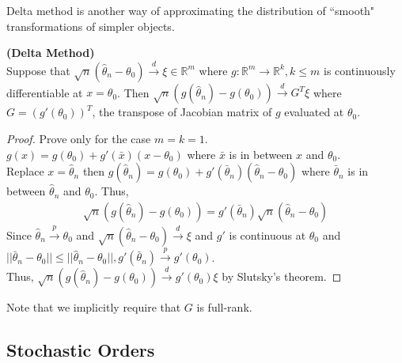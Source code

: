 \documentclass[11pt]{article} %
\theoremstyle{definition}
\numberwithin{defn}{subsection}
\numberwithin{thm}{subsection}
\numberwithin{ex}{subsection}
\newcommand{\bb}[1]{\mathbb{#1}}
\newcommand{\R}{\bb{R}}
\newcommand{\plim}{\overset{p}{\rightarrow}}
\newcommand{\dlim}{\overset{d}{\rightarrow}}
\begin{document}
Delta method is another way of approximating the distribution of ``smooth" transformations of simpler objects.%

\begin{thm}\label{thm:deltamethod}
	\textbf{(Delta Method)}\\
	Suppose that $\sqrt{n}(\hat{\theta}_n-\theta_0)\dlim\xi\in\R ^m$ where $g:\R^m\rightarrow\R^k,k\le m$ is continuously differentiable at $x=\theta_0$. Then $\sqrt{n}(g(\hat{\theta}_n)-g(\theta_0))\dlim G^T\xi$ where $G=(g'(\theta_0))^T$, the transpose of Jacobian matrix of $g$ evaluated at $\theta_0$.
	\begin{proof}
		Prove only for the case $m=k=1$.\\
		$g(x)=g(\theta_0)+g'(\bar{x})(x-\theta_0)$ where $\bar{x}$ is in between $x$ and $\theta_0$.\\
		Replace $x=\hat{\theta}_n$ then $g(\hat{\theta}_n)=g(\theta_0)+g'(\bar{\theta}_n)(\hat{\theta}_n-\theta_0)$ where $\bar{\theta}_n$ is in between $\hat{\theta}_n$ and $\theta_0$. Thus,
		\begin{align*}
		\sqrt{n}(g(\hat{\theta}_n)-g(\theta_0))=g'(\bar{\theta}_n)\sqrt{n}(\hat{\theta}_n-\theta_0)
		\end{align*}
		Since $\hat{\theta}_n\plim\theta_0$ and $\sqrt{n}(\hat{\theta}_n-\theta_0)\dlim\xi$ and $g'$ is continuous at $\theta_0$ and $||\bar{\theta}_n-\theta_0||\le||\hat{\theta}_n-\theta_0||,g'(\bar{\theta}_n)\plim g'(\theta_0)$.\\
		Thus, $\sqrt{n}(g(\hat{\theta}_n)-g(\theta_0))\dlim g'(\theta_0)\xi$ by Slutsky's theorem.
	\end{proof}	
	Note that we implicitly require that $G$ is full-rank.
\end{thm}

\subsection{Stochastic Orders}
\end{document}
